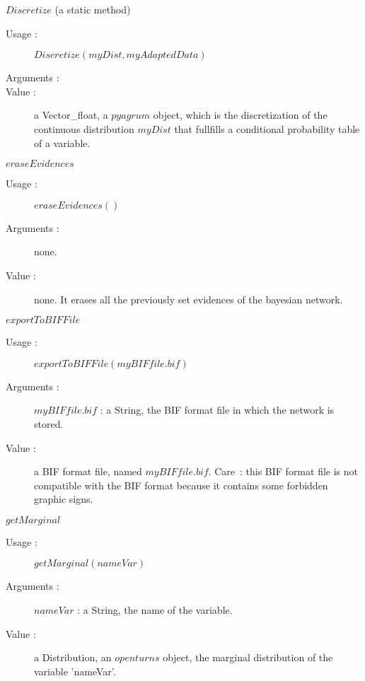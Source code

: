 \begin{description}
\begin{description}
  \item $Discretize$ (a static method)
    \begin{description}
    \item[Usage :]  $Discretize(myDist, myAdaptedData)$
    \item[Arguments :] \strut
    \item[Value :]  a Vector\_float, a $pyagrum$ object, which is the discretization of the continuous distribution $myDist$ that fullfills a conditional probability table of a variable.
    \end{description}
    \bigskip

  \item $eraseEvidences$
    \begin{description}
    \item[Usage :]  $eraseEvidences()$
    \item[Arguments :] none.
    \item[Value :]  none. It erases all the previously set evidences of the bayesian network.
    \end{description}
    \bigskip

  \item $exportToBIFFile$
    \begin{description}
    \item[Usage :]  $exportToBIFFile(myBIFfile.bif)$
    \item[Arguments :] $myBIFfile.bif$ : a String, the BIF format file in which the network is stored. 
    \item[Value :]  a BIF format file, named $myBIFfile.bif$. Care~: this BIF format file is not compatible with the BIF format because it contains some forbidden graphic signs.
    \end{description}
    \bigskip

  \item $getMarginal$
    \begin{description}
    \item[Usage :]  $getMarginal(nameVar)$
    \item[Arguments :] $nameVar$ : a String, the name of the variable.
    \item[Value :]  a Distribution, an $openturns$ object, the marginal distribution of the variable 'nameVar'.
    \end{description}
    \bigskip


\end{description}
\end{description}
